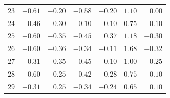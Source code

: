 \begin{mvtable}
{\begin{tabular}{|r|r|r|r|r|r|r|}
$23$ & $-0.61$ & $-0.20$ & $-0.58$ & $-0.20$ & $1.10$ & $0.00$\\
$24$ & $-0.46$ & $-0.30$ & $-0.10$ & $-0.10$ & $0.75$ & $-0.10$\\
$25$ & $-0.60$ & $-0.35$ & $-0.45$ & $0.37$ & $1.18$ & $-0.30$\\
$26$ & $-0.60$ & $-0.36$ & $-0.34$ & $-0.11$ & $1.68$ & $-0.32$\\
$27$ & $-0.31$ & $0.35$ & $-0.45$ & $-0.10$ & $1.00$ & $-0.25$\\
$28$ & $-0.60$ & $-0.25$ & $-0.42$ & $0.28$ & $0.75$ & $0.10$\\
$29$ & $-0.31$ & $0.25$ & $-0.34$ & $-0.24$ & $0.65$ & $0.10$\\
\hline
\end{tabular}}
\end{mvtable}

